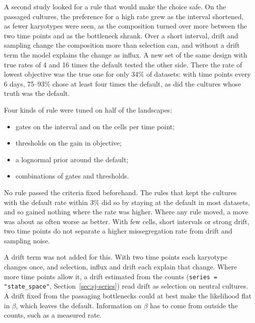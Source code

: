 \documentclass[11pt]{article}
\begin{document}
A second study looked for a rule that would make the choice safe. On the
passaged cultures, the preference for a high rate grew as the interval
shortened, as fewer karyotypes were seen, as the composition turned over
more between the two time points and as the bottleneck shrank. Over a short
interval, drift and sampling change the composition more than selection
can, and without a drift term the model explains the change as influx. A
new set of the same design with true rates of 4 and 16 times the default
tested the other side. There the rate of lowest objective was the true one
for only 34\% of datasets: with time points every 6 days, 75--93\% chose
at least four times the default, as did the cultures whose truth was the
default.

Four kinds of rule were tuned on half of the landscapes:
\begin{itemize}
\item gates on the interval and on the cells per time point;
\item thresholds on the gain in objective;
\item a lognormal prior around the default;
\item combinations of gates and thresholds.
\end{itemize}
No rule passed the criteria fixed beforehand. The rules that kept the
cultures with the default rate within 3\% did so by staying at the default
in most datasets, and so gained nothing where the rate was higher. Where any
rule moved, a move was about as often worse as better. With few cells,
short intervals or strong drift, two time points do not separate a higher
missegregation rate from drift and sampling noise.

A drift term was not added for this. With two time points each karyotype
changes once, and selection, influx and drift each explain that change.
Where more time points allow it, a drift estimated from the counts
(\texttt{series = "state\_space"}, Section~\ref{sec:sj-series}) read drift as
selection on neutral cultures. A drift fixed from the passaging bottlenecks
could at best make the likelihood flat in $\beta$, which leaves the default.
Information on $\beta$ has to come from outside the counts, such as a
measured rate.
\end{document}
